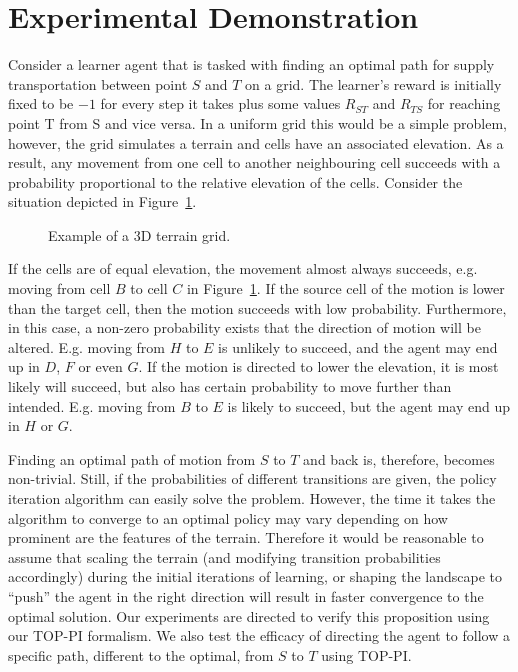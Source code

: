 \section{Experimental Demonstration}\label{sec: experiments}
Consider a learner agent that is tasked with finding an optimal path
for supply transportation between point $S$ and $T$ on a grid. The
learner's reward is initially fixed to be $-1$ for every step it takes
plus some values $R_{ST}$ and $R_{TS}$ for reaching point T from S and
vice versa. In a uniform grid this would be a simple problem, however,
the grid simulates a terrain and cells have an associated elevation.  
As a result, any movement from one cell to another neighbouring cell
succeeds with a probability proportional to the relative elevation of 
the cells. Consider the situation depicted in Figure~\ref{exp_motion}. 

\begin{figure}[ht]
\centerline{}
\caption{\label{exp_motion}Example of a 3D terrain grid.}
\end{figure}

If the cells are of equal elevation, the movement almost always
succeeds, e.g. moving from cell $B$ to cell $C$ in
Figure~\ref{exp_motion}. If the source cell of the motion is lower
than the target cell, then the motion succeeds with low
probability. Furthermore, in this case, a non-zero probability exists
that the direction of motion will be altered. E.g. moving from $H$ to
$E$ is unlikely to succeed, and the agent may end up in $D$, $F$ or
even $G$. If the motion is directed to lower the elevation, it is most
likely will succeed, but also has certain probability to move further
than intended. E.g. moving from $B$ to $E$ is likely to succeed, but
the agent may end up in $H$ or $G$.

Finding an optimal path of motion from $S$ to $T$ and back is,
therefore, becomes non-trivial. Still, if the probabilities of
different transitions are given, the policy iteration algorithm can
easily solve the problem. However, the time it takes the algorithm to
converge to an optimal policy may vary depending on how prominent are
the features of the terrain. Therefore it would be reasonable to
assume that scaling the terrain (and modifying transition
probabilities accordingly) during the initial iterations of learning,
or shaping the landscape to ``push'' the agent in the right direction
will result in faster convergence to the optimal solution. Our
experiments are directed to verify this proposition using our TOP-PI
formalism.  We also test the efficacy of directing the agent to follow
a specific path, different to the optimal, from $S$ to $T$ using TOP-PI.

